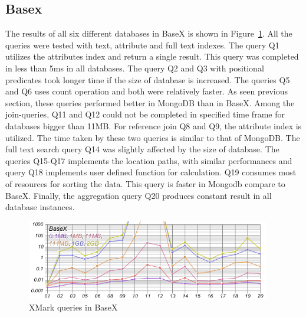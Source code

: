 \subsection{Basex}
The results of all six different databases in BaseX is shown in Figure~\ref{fig:xmark-result-basex-all}. All the queries were tested with text, attribute and full text indexes. The query Q1 utilizes the attributes index and return a single result. This query was completed in less than 5ms in all databases. The query Q2 and Q3  with positional predicates took longer time if the size of database is increased. The queries Q5 and Q6 uses count operation and both were relatively faster. As seen previous section, these queries performed better in MongoDB than in BaseX. Among the join-queries,  Q11 and Q12 could not be completed in specified time frame for databases bigger than 11MB. For reference join Q8 and Q9, the attribute index is utilized. The time taken by these two queries is  similar to that of MongoDB.  The full text search query Q14 was slightly affected by the size of database. The queries Q15-Q17 implements the location paths, with similar performances and query Q18  implements user defined function for calculation. Q19 consumes most of resources for sorting the data. This query is faster in Mongodb compare to BaseX. Finally, the aggregation query Q20 produces constant result in all database instances. 
\begin{figure}
	\centering
	\includegraphics[width=0.95\textwidth]{img/result/basex/basex-all}
	\caption{XMark queries in BaseX}
	\label{fig:xmark-result-basex-all}
\end{figure}

